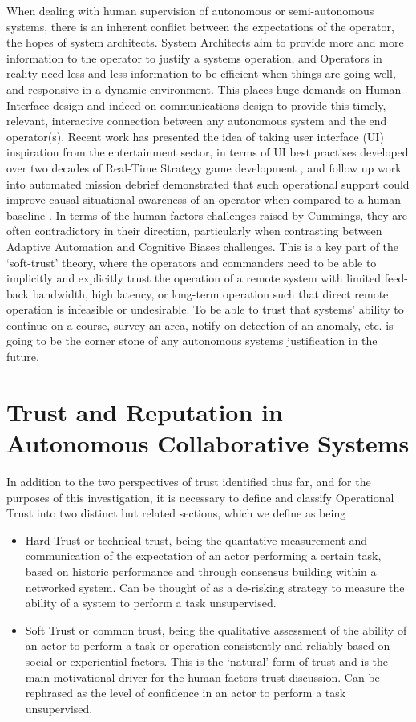 When dealing with human supervision of autonomous or semi-autonomous systems, there is an inherent conflict between the expectations of the operator, the hopes of system architects.
System Architects aim to provide more and more information to the operator to justify a systems operation, and Operators in reality need less and less information to be efficient when things are going well, and responsive in a dynamic environment. This places huge demands on Human Interface design and indeed on communications design to provide this timely, relevant, interactive connection between any autonomous system and the end operator(s).
Recent work has presented the idea of taking user interface (UI) inspiration from the entertainment sector, in terms of UI best practises developed over two decades of Real-Time Strategy game development \cite{Johnson2007}, and follow up work into automated mission debrief demonstrated that such operational support could improve causal situational awareness of an operator when compared to a human-baseline \cite{Johnson2011}.
In terms of the human factors challenges raised by Cummings, they are often contradictory in their direction, particularly when contrasting between Adaptive Automation and Cognitive Biases challenges.
This is a key part of the ‘soft-trust’ theory, where the operators and commanders need to be able to implicitly and explicitly trust the operation of a remote system with limited feed-back bandwidth, high latency, or long-term operation such that direct remote operation is infeasible or undesirable. To be able to trust that systems’ ability to continue on a course, survey an area, notify on detection of an anomaly, etc. is going to be the corner stone of any autonomous systems justification in the future.

\section{Trust and Reputation in Autonomous Collaborative Systems}

In addition to the two perspectives of trust identified thus far, and for the purposes of this investigation, it is necessary to define and classify Operational Trust into two distinct but related sections, which we define as being

\begin{itemize}
	\item Hard Trust or technical trust, being the quantative measurement and communication of the expectation of an actor performing a certain task, based on historic performance and through consensus building within a networked system. Can be thought of as a de-risking strategy to measure the ability of a system to perform a task unsupervised.

	\item Soft Trust or common trust, being the qualitative assessment of the ability of an actor to perform a task or operation consistently and reliably based on social or experiential factors. This is the ‘natural’ form of trust and is the main motivational driver for the human-factors trust discussion. Can be rephrased as the level of confidence in an actor to perform a task unsupervised.
\end{itemize}

